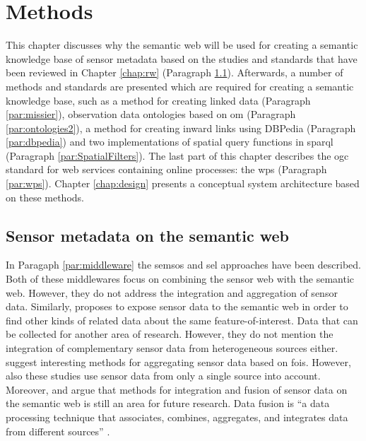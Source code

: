 


\chapter{Methods}
\label{chap:methods}

This chapter discusses why the semantic web will be used for creating a semantic knowledge base of sensor metadata based on the studies and standards that have been reviewed in Chapter \ref{chap:rw} (Paragraph \ref{par:LDmetadata}). Afterwards, a number of methods and standards are presented which are required for creating a semantic knowledge base, such as a method for creating linked data (Paragraph \ref{par:missier}), observation data ontologies based on \ac{om} (Paragraph \ref{par:ontologies2}), a method for creating inward links using DBPedia (Paragraph \ref{par:dbpedia}) and two implementations of spatial query functions in \ac{sparql} (Paragraph \ref{par:SpatialFilters}). The last part of this chapter describes the \ac{ogc} standard for web services containing online processes: the \acf{wps} (Paragraph \ref{par:wps}). Chapter \ref{chap:design} presents a conceptual system architecture based on these methods. 

\section{Sensor metadata on the semantic web}
\label{par:LDmetadata}
In Paragaph \ref{par:middleware} the \ac{semsos} \citep{SSW:Henson, SSW:Pschorr} and \ac{sel} \citep{SSW:Janowicz} approaches have been described. Both of these middlewares focus on combining the sensor web with the semantic web. However, they do not address the integration and aggregation of sensor data. Similarly, \cite{SSW:Atkinson} proposes to expose sensor data to the semantic web in order to find other kinds of related data about the same feature-of-interest. Data that can be collected for another area of research. However, they do not mention the integration of complementary sensor data from heterogeneous sources either. \citet{SSW:Stasch3,SSW:Stasch} suggest interesting methods for aggregating sensor data based on \acfp{foi}. However, also these studies use sensor data from only a single source into account. Moreover, \cite{SSW:Corcho} and \cite{SSW:Ji} argue that methods for integration and fusion of sensor data on the semantic web is still an area for future research. Data fusion is \enquote{a data processing technique that associates, combines, aggregates, and integrates data from different sources} \cite[p. 2]{SSW:Wang2}. 

